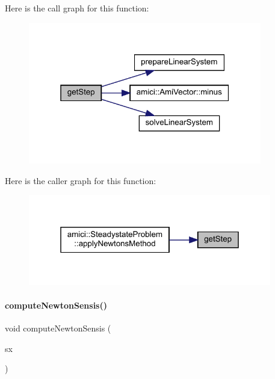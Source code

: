 Here is the call graph for this function\+:
\nopagebreak
\begin{figure}[H]
\begin{center}
\leavevmode
\includegraphics[width=289pt]{classamici_1_1_newton_solver_a7b71b3735b6ca62570266f9d6fce33cb_cgraph}
\end{center}
\end{figure}
Here is the caller graph for this function\+:
\nopagebreak
\begin{figure}[H]
\begin{center}
\leavevmode
\includegraphics[width=301pt]{classamici_1_1_newton_solver_a7b71b3735b6ca62570266f9d6fce33cb_icgraph}
\end{center}
\end{figure}
\mbox{\label{classamici_1_1_newton_solver_a90d4823c7b8373d9aaccba80c930a7c7}} 
\paragraph{\texorpdfstring{computeNewtonSensis()}{computeNewtonSensis()}}
{\footnotesize\ttfamily void compute\+Newton\+Sensis (\begin{DoxyParamCaption}\item[{\mbox{\hyperlink{classamici_1_1_ami_vector_array}{Ami\+Vector\+Array}} $\ast$}]{sx }\end{DoxyParamCaption})}

